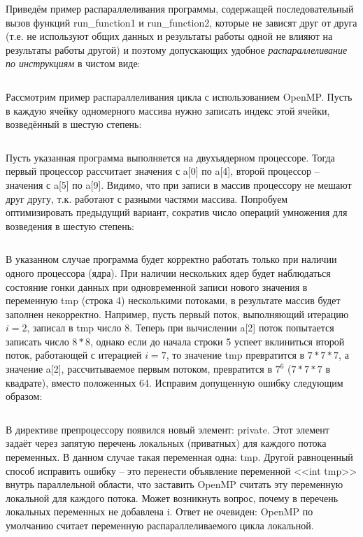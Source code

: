 Приведём пример распараллеливания программы, содержащей последовательный вызов функций run\_function1 и run\_function2, которые не зависят друг от друга (т.е. не используют общих данных и результаты работы одной не влияют на результаты работы другой) и поэтому допускающих удобное \textit{распараллеливание по инструкциям} в чистом виде:

\inputminted{c++}{listings/OpenMPExample4.cpp}

Рассмотрим пример распараллеливания цикла с использованием OpenMP. Пусть в каждую ячейку одномерного массива нужно записать индекс этой ячейки, возведённый в шестую степень:

\inputminted{c++}{listings/OpenMPExample5.cpp}

Пусть указанная программа выполняется на двухъядерном процессоре. Тогда первый процессор рассчитает значения с a[0] по a[4], второй процессор – значения с a[5] по a[9]. Видимо, что при записи в массив процессору не мешают друг другу, т.к. работают с разными частями массива. Попробуем оптимизировать предыдущий вариант, сократив число операций умножения для возведения в шестую степень:

\inputminted{c++}{listings/OpenMPExample6.cpp}

В указанном случае программа будет корректно работать только при наличии одного процессора (ядра). При наличии нескольких ядер будет наблюдаться состояние гонки данных при одновременной записи нового значения в переменную tmp (строка 4) несколькими потоками, в результате массив будет заполнен некорректно. Например, пусть первый поток, выполняющий итерацию $i=2$, записал в tmp число 8. Теперь при вычислении a[2] поток попытается записать число $8*8$, однако если до начала строки 5 успеет вклиниться второй поток, работающей с итерацией $i=7$, то значение tmp превратится в $7*7*7$, а значение a[2], рассчитываемое первым потоком, превратится в $7^6$ ($7*7*7$ в квадрате), вместо положенных 64. Исправим допущенную ошибку следующим образом:

\inputminted{c++}{listings/OpenMPExample7.cpp}

В директиве препроцессору появился новый элемент: private. Этот элемент задаёт через запятую перечень локальных (приватных) для каждого потока переменных. В данном случае такая переменная одна: tmp. Другой равноценный способ исправить ошибку -- это перенести объявление переменной <<int tmp>> внутрь параллельной области, что заставить OpenMP считать эту переменную локальной для каждого потока. Может возникнуть вопрос, почему в перечень локальных переменных не добавлена i. Ответ не очевиден: OpenMP по умолчанию считает переменную распараллеливаемого цикла локальной.

